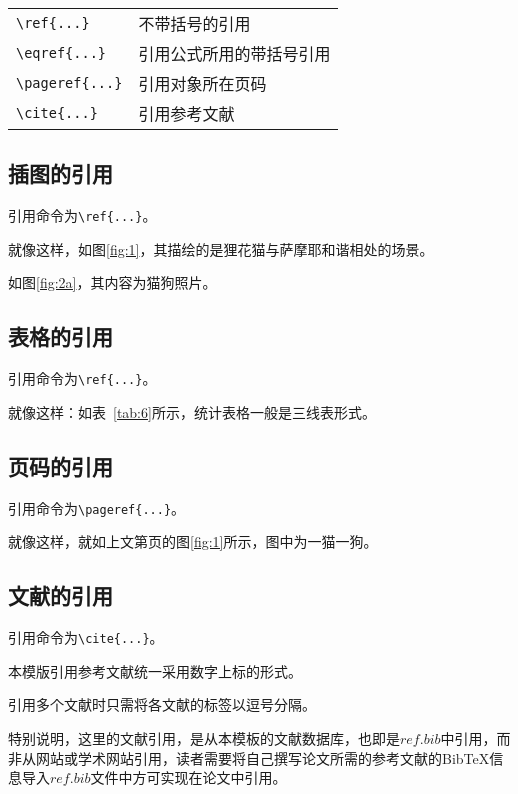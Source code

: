 \begin{tabular}{l l}
  \verb|\ref{...}|   & 不带括号的引用 \\
  \verb|\eqref{...}|  & 引用公式所用的带括号引用 \\
  \verb|\pageref{...}| & 引用对象所在页码 \\
  \verb|\cite{...}| & 引用参考文献 
\end{tabular}

\subsection{插图的引用}

引用命令为\verb|\ref{...}|。

就像这样，如图\ref{fig:1}，其描绘的是狸花猫与萨摩耶和谐相处的场景。\par 
如图\ref{fig:2a}，其内容为猫狗照片。

\subsection{表格的引用}

引用命令为\verb|\ref{...}|。

就像这样：如表~\ref{tab:6}所示，统计表格一般是三线表形式。

\subsection{页码的引用}

引用命令为\verb|\pageref{...}|。

就像这样，就如上文第\pageref{fig:1}页的图\ref{fig:1}所示，图中为一猫一狗。

\subsection{文献的引用}

引用命令为\verb|\cite{...}|。

本模版引用参考文献统一采用数字上标的形式\cite{r1}。

引用多个文献时只需将各文献的标签以逗号分隔\cite{r1,r2,r3,r4,r5}。

特别说明，这里的文献引用，是从本模板的文献数据库，也即是$ref.bib$中引用，而非从网站或学术网站引用，读者需要将自己撰写论文所需的参考文献的BibTeX信息导入$ref.bib$文件中方可实现在论文中引用。